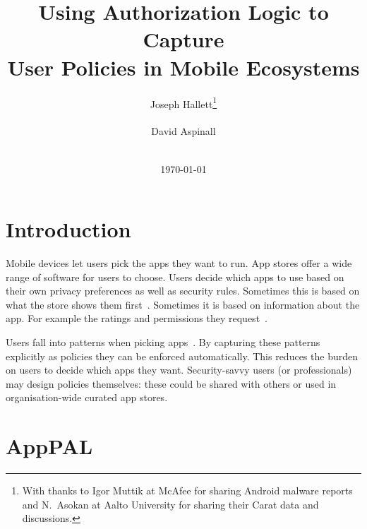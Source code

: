 \documentclass[]{soups-poster}
\newcommand{\citep}[1]{\cite{#1}}
\begin{document}
\title{Using Authorization Logic to Capture\\User Policies in Mobile Ecosystems}
\author{%
  \alignauthor{}
  Joseph Hallett\thanks{With thanks to Igor Muttik at McAfee for sharing Android malware reports and N{.}~Asokan at Aalto University for sharing their Carat data and discussions.}\\
  \\
  \alignauthor{}
  David Aspinall\\
  \\
}
\date\today
\maketitle

\section{Introduction}

Mobile devices let users pick the apps they want to run.
App stores offer a wide range of software for users to choose.
Users decide which apps to use based on their own privacy preferences as well as security rules. %
Sometimes this is based on what the store shows them first~\citep{Prata:2012in}.
Sometimes it is based on information about the app.
For example the ratings and permissions they request~\citep{Kelley:2013kc}.

Users fall into patterns when picking apps~\citep{Sadeh:2014vq}.
By capturing these patterns explicitly as policies they can be enforced automatically. 
This reduces the burden on users to decide which apps they want.
Security-savvy users (or professionals) may design policies themselves:
  these could be shared with others or used in organisation-wide curated app stores.

%

\section{AppPAL}
\end{document}
